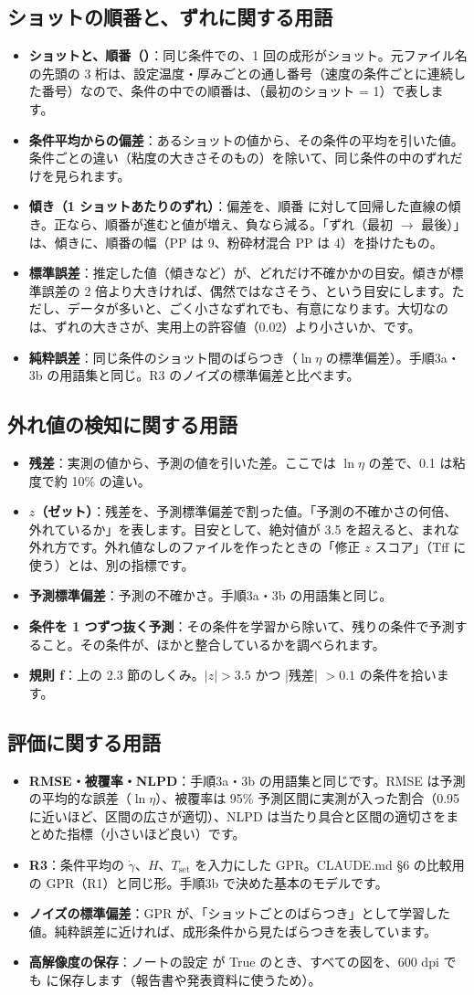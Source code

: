 \documentclass[paper=a4paper,fontsize=10.5pt,line_length=44zw,number_of_lines=38]{jlreq}
\newcommand{\file}[1]{\texttt{\detokenize{#1}}}
\newcommand{\gd}{\dot{\gamma}}
\newcommand{\Tset}{T_{\mathrm{set}}}
\newenvironment{termlist}{\begin{itemize}[label=・,leftmargin=1\zw,labelwidth=1\zw,labelsep=0pt,itemsep=0.4ex,topsep=0.6ex,parsep=0pt]}{\end{itemize}}
\newcommand{\term}[1]{\item \textbf{#1}：}
\begin{document}
\subsection{ショットの順番と、ずれに関する用語}
\begin{termlist}
\term{ショットと、順番（\file{pos}）}同じ条件での、1 回の成形がショット。元ファイル名の先頭の 3 桁は、設定温度・厚みごとの通し番号（速度の条件ごとに連続した番号）なので、条件の中での順番は、\textbf{\file{pos}}（最初のショット = 1）で表します。
\term{条件平均からの偏差}あるショットの値から、その条件の平均を引いた値。条件ごとの違い（粘度の大きさそのもの）を除いて、同じ条件の中のずれだけを見られます。
\term{傾き（1 ショットあたりのずれ）}偏差を、順番 \file{pos} に対して回帰した直線の傾き。正なら、順番が進むと値が増え、負なら減る。「ずれ（最初 $\to$ 最後）」は、傾きに、順番の幅（PP は 9、粉砕材混合 PP は 4）を掛けたもの。
\term{標準誤差}推定した値（傾きなど）が、どれだけ不確かかの目安。傾きが標準誤差の 2 倍より大きければ、偶然ではなさそう、という目安にします。ただし、データが多いと、ごく小さなずれでも、有意になります。大切なのは、ずれの大きさが、実用上の許容値（0.02）より小さいか、です。
\term{純粋誤差}同じ条件のショット間のばらつき（$\ln\eta$ の標準偏差）。手順3a・3b の用語集と同じ。R3 のノイズの標準偏差と比べます。
\end{termlist}

\subsection{外れ値の検知に関する用語}
\begin{termlist}
\term{残差}実測の値から、予測の値を引いた差。ここでは $\ln\eta$ の差で、0.1 は粘度で約 10\% の違い。
\term{$z$（ゼット）}残差を、予測標準偏差で割った値。「予測の不確かさの何倍、外れているか」を表します。目安として、絶対値が 3.5 を超えると、まれな外れ方です。外れ値なしのファイルを作ったときの「修正 $z$ スコア」（Tff に使う）とは、別の指標です。
\term{予測標準偏差}予測の不確かさ。手順3a・3b の用語集と同じ。
\term{条件を 1 つずつ抜く予測}その条件を学習から除いて、残りの条件で予測すること。その条件が、ほかと整合しているかを調べられます。
\term{規則 f}上の 2.3 節のしくみ。$|z|>3.5$ かつ |残差| $>0.1$ の条件を拾います。
\end{termlist}

\subsection{評価に関する用語}
\begin{termlist}
\term{RMSE・被覆率・NLPD}手順3a・3b の用語集と同じです。RMSE は予測の平均的な誤差（$\ln\eta$）、被覆率は 95\% 予測区間に実測が入った割合（0.95 に近いほど、区間の広さが適切）、NLPD は当たり具合と区間の適切さをまとめた指標（小さいほど良い）です。
\term{R3}条件平均の $\gd$、$H$、$\Tset$ を入力にした GPR。CLAUDE.md §6 の比較用の GPR（R1）と同じ形。手順3b で決めた基本のモデルです。
\term{ノイズの標準偏差}GPR が、「ショットごとのばらつき」として学習した値。純粋誤差に近ければ、成形条件から見たばらつきを表しています。
\term{高解像度の保存}ノートの設定 \file{HR\_ALL} が True のとき、すべての図を、600 dpi でも \file{highres/} に保存します（報告書や発表資料に使うため）。
\end{termlist}
\end{document}
